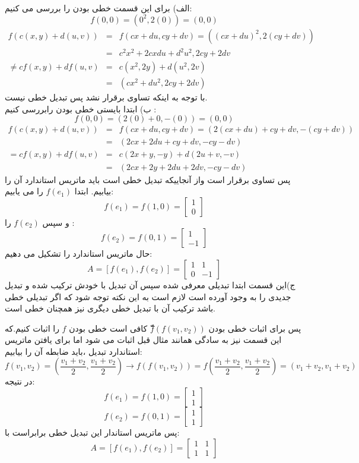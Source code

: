 \documentclass{article}
\begin{document}
الف) برای این قسمت خطی بودن را بررسی می کنیم:
ّ$$f(0,0)=(0^2,2(0))=(0,0)$$
\begin{eqnarray*}
 f(c(x,y)+d(u,v))&=&f(cx+du,cy+dv)=((cx+du)^2,2(cy+dv))\\
	&=&c^2x^2+2cxdu+d^2u^2,2cy+2dv\\
	\neq cf(x,y)+df(u,v)&=&c(x^2,2y)+d(u^2,2v)\\
	&=&(cx^2+du^2,2cy+2dv) 
	 \end{eqnarray*}
 با توجه به اینکه تساوی برقرار نشد پس تبدیل خطی نیست.
 \\
ب) ابتدا بایستی خطی بودن رابررسی کنیم :
$$f(0,0)=(2(0)+0,-(0))=(0,0)$$
\begin{eqnarray*}
	f(c(x,y)+d(u,v))&=&f(cx+du,cy+dv)=(2(cx+du)+cy+dv,-(cy+dv))\\
	&=&(2cx+2du+cy+dv,-cy-dv)\\
	= cf(x,y)+df(u,v)&=&c(2x+y,-y)+d(2u+v,-v)\\
	&=&(2cx+2y+2du+2dv,-cy-dv) 
\end{eqnarray*}
پس تساوی برقرار است واز آنجاییکه تبدیل خطی است  باید ماتریس استاندارد آن را بیابیم.
ابتدا 
$f(e_1)$
را می یابیم:
$$f(e_1)=f(1,0)= \begin{bmatrix}
1\\
0
\end{bmatrix}$$
و سپس 
$f(e_2)$
را :
$$f(e_2)=f(0,1)=\begin{bmatrix}
1\\
-1
\end{bmatrix}$$
حال ماتریس استاندارد را تشکیل می دهیم: 
$$A=[f(e_1),f(e_2)]=\begin{bmatrix}
1&1\\
0&-1
\end{bmatrix}$$
ج)این قسمت ابتدا تبدیلی معرفی شده سپس آن تبدیل با خودش ترکیب شده و تبدیل جدیدی را به وجود آورده است لازم است به این نکته توجه شود که اگر تبدیلی خطی باشد ترکیب آن با تبدیل خطی دیگری نیز همچنان خطی است. 

پس برای اثبات خطی بودن 
$ّّf(f(v_1,v_2))$
کافی است خطی بودن 
$f$
را اثبات کنیم.که این قسمت نیز به سادگی همانند مثال قبل اثبات می شود اما برای یافتن ماتریس استاندارد تبدیل ،باید ضابطه آن را بیابیم: 
$$f(v_1,v_2)=(\frac{v_1+v_2}{2},\frac{v_1+v_2}{2})\to f(f(v_1,v_2))=f(\frac{v_1+v_2}{2},\frac{v_1+v_2}{2})=(v_1+v_2,v_1+v_2)$$
در نتیجه:
$$f(e_1)=f(1,0)=\begin{bmatrix}
1\\
1
\end{bmatrix}
$$ $$f(e_2)=f(0,1)=\begin{bmatrix}
	1\\
	1
\end{bmatrix}$$
پس ماتریس استاندار این تبدیل خطی برابراست با:
$$A=[f(e_1),f(e_2)]=\begin{bmatrix}
1&1\\
1&1
\end{bmatrix}$$
\end{document}
